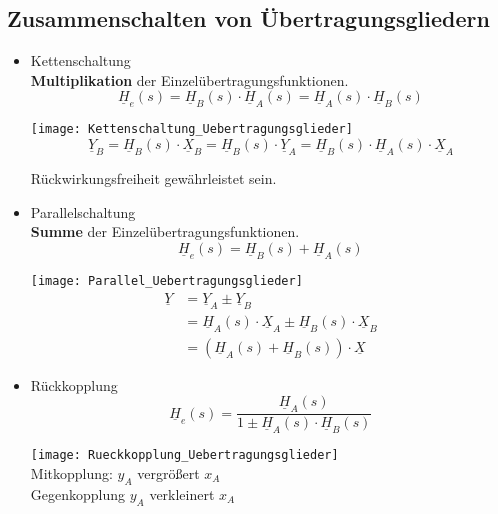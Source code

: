 \subsection{Zusammenschalten von Übertragungsgliedern}
\begin{mdframed}[style=exercise]
\begin{itemize}
    \item Kettenschaltung\\
        \textbf{Multiplikation} der Einzelübertragungsfunktionen.
        \[
            \boxed{\underline{H}_{e}(s)=\underline{H}_{B}(s) \cdot \underline{H}_{A}(s)=\underline{H}_{A}(s) \cdot \underline{H}_{B}(s)}
        \]
        \begin{center}
            \texttt{[image: Kettenschaltung\_Uebertragungsglieder]}
            \[
                \underline{Y}_{B}=\underline{H}_{B}(s) \cdot \underline{X}_{B}=\underline{H}_{B}(s) \cdot \underline{Y}_{A}=\underline{H}_{B}(s) \cdot \underline{H}_{A}(s) \cdot \underline{X}_{A}
            \]
        \end{center}
        Rückwirkungsfreiheit gewährleistet sein.
    \item Parallelschaltung\\
        \textbf{Summe} der Einzelübertragungsfunktionen.
        \[
            \boxed{\underline{H}_{e}(s)=\underline{H}_{B}(s) + \underline{H}_{A}(s)}
        \]
        \begin{center}
            \texttt{[image: Parallel\_Uebertragungsglieder]}
            \begin{align*}
                \underline{Y}&=\underline{Y}_{A} \pm \underline{Y}_{B}\\
                             &=\underline{H}_{A}(s) \cdot \underline{X}_{A} \pm \underline{H}_{B}(s) \cdot \underline{X}_{B}\\
                             &=\left(\underline{H}_{A}(s)+\underline{H}_{B}(s)\right) \cdot \underline{X}
            \end{align*}
        \end{center}
    \item Rückkopplung
        \[
            \boxed{\underline{H}_{e}(s)=\frac{\underline{H}_{A}(s)}{1\pm\underline{H}_{A}(s) \cdot \underline{H}_{B}(s)}}
        \]
        \begin{center}
            \texttt{[image: Rueckkopplung\_Uebertragungsglieder]}\\
            Mitkopplung: $y_A$ vergrößert $x_A$\\
            Gegenkopplung $y_A$ verkleinert $x_A$
        \end{center}

\end{itemize}
\end{mdframed}

